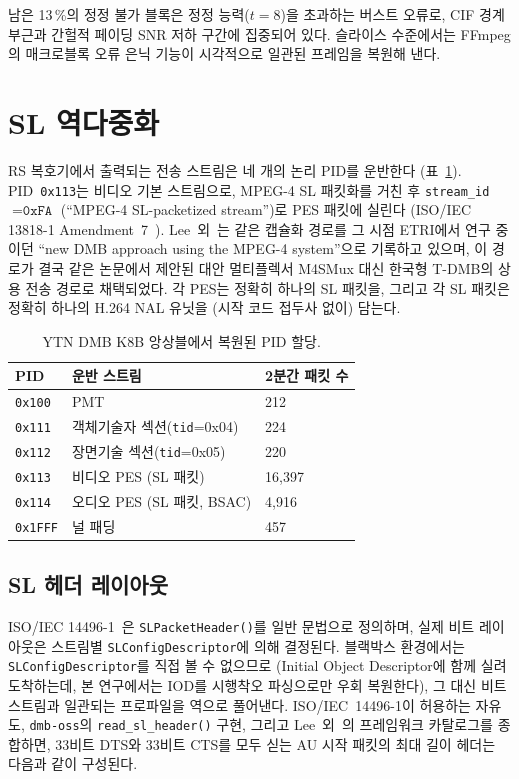 \documentclass[11pt,a4paper]{article}
\begin{document}
남은 13\,\%의 정정 불가 블록은 정정 능력($t=8$)을 초과하는 버스트 오류로,
CIF 경계 부근과 간헐적 페이딩 SNR 저하 구간에 집중되어 있다.  슬라이스
수준에서는 FFmpeg의 매크로블록 오류 은닉 기능이 시각적으로 일관된
프레임을 복원해 낸다.

\section{SL 역다중화}\label{sec:sl}

RS 복호기에서 출력되는 전송 스트림은 네 개의 논리 PID를 운반한다
(표~\ref{tab:pids}).  PID~\texttt{0x113}는 비디오 기본 스트림으로,
MPEG-4 SL 패킷화를 거친 후 \texttt{stream\_id}~$=\texttt{0xFA}$
(``MPEG-4 SL-packetized stream'')로 PES 패킷에 실린다 (ISO/IEC
13818-1 Amendment~7~\cite{iso13818-1-amd7}).
Lee~외~\cite{lee2004m4smux}는 같은 캡슐화 경로를 그 시점 ETRI에서
연구 중이던 ``new DMB approach using the MPEG-4 system''으로
기록하고 있으며, 이 경로가 결국 같은 논문에서 제안된 대안
멀티플렉서 M4SMux 대신 한국형 T-DMB의 상용 전송 경로로 채택되었다.
각 PES는 정확히 하나의 SL 패킷을, 그리고 각 SL 패킷은 정확히
하나의 H.264 NAL 유닛을 (시작 코드 접두사 없이) 담는다.

\begin{table}[t]
\centering
\caption{YTN DMB K8B 앙상블에서 복원된 PID 할당.}
\label{tab:pids}
\begin{tabular}{lll}
\toprule
PID & 운반 스트림 & 2분간 패킷 수 \\
\midrule
\texttt{0x100} & PMT                                & 212 \\
\texttt{0x111} & 객체기술자 섹션(\texttt{tid}=0x04) & 224 \\
\texttt{0x112} & 장면기술 섹션(\texttt{tid}=0x05)   & 220 \\
\texttt{0x113} & 비디오 PES (SL 패킷)               & 16{,}397 \\
\texttt{0x114} & 오디오 PES (SL 패킷, BSAC)         & 4{,}916 \\
\texttt{0x1FFF} & 널 패딩                           & 457 \\
\bottomrule
\end{tabular}
\end{table}

\subsection{SL 헤더 레이아웃}

ISO/IEC 14496-1~\cite{iso14496-1}은 \texttt{SLPacketHeader()}를
일반 문법으로 정의하며, 실제 비트 레이아웃은 스트림별
\texttt{SLConfigDescriptor}에 의해 결정된다.  블랙박스 환경에서는
\texttt{SLConfigDescriptor}를 직접 볼 수 없으므로 (Initial Object
Descriptor에 함께 실려 도착하는데, 본 연구에서는 IOD를 시행착오
파싱으로만 우회 복원한다), 그 대신 비트스트림과 일관되는 프로파일을
역으로 풀어낸다.  ISO/IEC~14496-1이 허용하는 자유도, \texttt{dmb-oss}의
\texttt{read\_sl\_header()} 구현, 그리고 Lee~외~\cite{lee2004m4smux}의
프레임워크 카탈로그를 종합하면, 33비트 DTS와 33비트 CTS를 모두 싣는
AU 시작 패킷의 최대 길이 헤더는 다음과 같이 구성된다.
\end{document}
